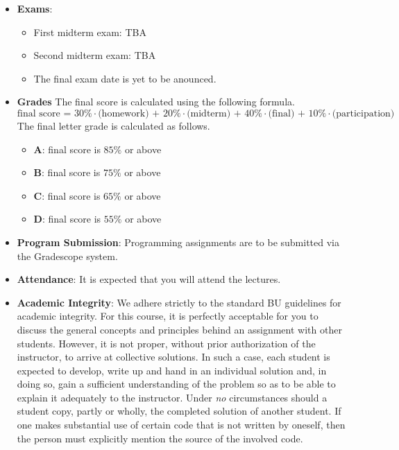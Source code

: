 \documentclass[11pt]{article}
\begin{document}
\begin{itemize}
\item {\bf Exams}:
\begin{itemize}
\item
First midterm exam: TBA
\item
Second midterm exam: TBA
\item
The final exam date is yet to be anounced.
\end{itemize}

\item {\bf Grades}
The final score is calculated using the following formula.
\[\mbox{final score = 30\%$\cdot$(homework) + 20\%$\cdot$(midterm) + 40\%$\cdot$(final) + 10\%$\cdot$(participation)}\]
The final letter grade is calculated as follows.
\begin{itemize}
\item{\bf A}: final score is $85\%$ or above
\item{\bf B}: final score is $75\%$ or above
\item{\bf C}: final score is $65\%$ or above
\item{\bf D}: final score is $55\%$ or above
\end{itemize}

\item
{\bf Program Submission}:
Programming assignments are to be submitted via the Gradescope system.

\item
{\bf Attendance}:
It is expected that you will attend the lectures.

\item
{\bf Academic Integrity}:
We adhere strictly to the standard BU guidelines for academic
integrity. For this course, it is perfectly acceptable for you to discuss
the general concepts and principles behind an assignment with other
students. However, it is not proper, without prior authorization of the
instructor, to arrive at collective solutions. In such a case, each student
is expected to develop, write up and hand in an individual solution and, in
doing so, gain a sufficient understanding of the problem so as to be able
to explain it adequately to the instructor.  Under {\em no} circumstances
should a student copy, partly or wholly, the completed solution of another
student. If one makes substantial use of certain code that is not written by
oneself, then the person must explicitly mention the source of the involved
code.

\end{itemize}
\end{document}
